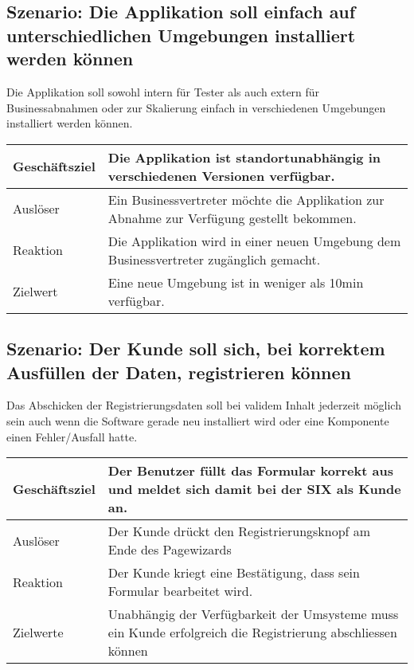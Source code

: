 \subsection{Szenario: Die Applikation soll einfach auf unterschiedlichen Umgebungen installiert werden können}

Die Applikation soll sowohl intern für Tester als auch extern für Businessabnahmen oder zur Skalierung einfach in verschiedenen Umgebungen installiert werden können.

\begin{table}[H]
	\centering
	\begin{tabular}{ | p{3cm} | p{12cm} | }
		\toprule
		Geschäftsziel & Die Applikation ist standortunabhängig in verschiedenen Versionen verfügbar. \\ \hline
		Auslöser & Ein Businessvertreter möchte die Applikation zur Abnahme zur Verfügung gestellt bekommen. \\ \hline
		Reaktion & Die Applikation wird in einer neuen Umgebung dem Businessvertreter zugänglich gemacht. \\ \hline
		Zielwert & Eine neue Umgebung ist in weniger als 10min verfügbar. \\
		\bottomrule
	\end{tabular}
\end{table}

\subsection{Szenario: Der Kunde soll sich, bei korrektem Ausfüllen der Daten, registrieren können}

Das Abschicken der Registrierungsdaten soll bei validem Inhalt jederzeit möglich sein auch wenn die Software gerade neu installiert wird oder eine Komponente einen Fehler/Ausfall hatte.

\begin{table}[H]
	\centering
	\begin{tabular}{ | p{3cm} | p{12cm} | }
		\toprule
		Geschäftsziel & Der Benutzer füllt das Formular korrekt aus und meldet sich damit bei der SIX als Kunde an. \\ \hline
		Auslöser & Der \Gls{Kunde} drückt den Registrierungsknopf am Ende des Pagewizards \\  \hline
		Reaktion & Der Kunde kriegt eine Bestätigung, dass sein Formular bearbeitet wird. \\ \hline
		Zielwerte & Unabhängig der Verfügbarkeit der Umsysteme muss ein Kunde erfolgreich die Registrierung abschliessen können \\
		\bottomrule
	\end{tabular}
\end{table}
\newpage

